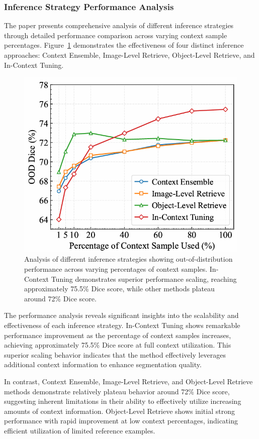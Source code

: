 \subsubsection{Inference Strategy Performance Analysis}
The paper presents comprehensive analysis of different inference strategies through detailed performance comparison across varying context sample percentages. Figure~\ref{fig:performance_comparison} demonstrates the effectiveness of four distinct inference approaches: Context Ensemble, Image-Level Retrieve, Object-Level Retrieve, and In-Context Tuning.

\begin{figure}[t]
  \centering
  \includegraphics[width=0.8\linewidth]{fig/performance_comparison.png}
  \caption{Analysis of different inference strategies showing out-of-distribution performance across varying percentages of context samples. In-Context Tuning demonstrates superior performance scaling, reaching approximately 75.5\% Dice score, while other methods plateau around 72\% Dice score.}
  \label{fig:performance_comparison}
\end{figure}

The performance analysis reveals significant insights into the scalability and effectiveness of each inference strategy. In-Context Tuning shows remarkable performance improvement as the percentage of context samples increases, achieving approximately 75.5\% Dice score at full context utilization. This superior scaling behavior indicates that the method effectively leverages additional context information to enhance segmentation quality.

In contrast, Context Ensemble, Image-Level Retrieve, and Object-Level Retrieve methods demonstrate relatively plateau behavior around 72\% Dice score, suggesting inherent limitations in their ability to effectively utilize increasing amounts of context information. Object-Level Retrieve shows initial strong performance with rapid improvement at low context percentages, indicating efficient utilization of limited reference examples.

